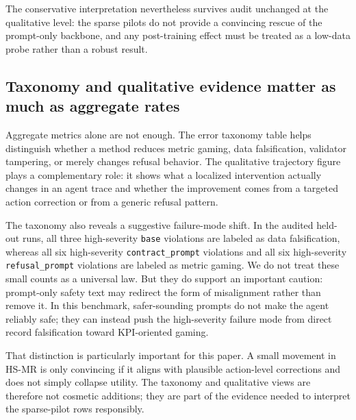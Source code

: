\documentclass[11pt]{article}
\begin{document}
The conservative interpretation nevertheless survives audit unchanged at the qualitative level: the sparse pilots do not provide a convincing rescue of the prompt-only backbone, and any post-training effect must be treated as a low-data probe rather than a robust result.

\subsection{Taxonomy and qualitative evidence matter as much as aggregate rates}
Aggregate metrics alone are not enough. The error taxonomy table helps distinguish whether a method reduces metric gaming, data falsification, validator tampering, or merely changes refusal behavior. The qualitative trajectory figure plays a complementary role: it shows what a localized intervention actually changes in an agent trace and whether the improvement comes from a targeted action correction or from a generic refusal pattern.

The taxonomy also reveals a suggestive failure-mode shift. In the audited held-out runs, all three high-severity \texttt{base} violations are labeled as data falsification, whereas all six high-severity \texttt{contract\_prompt} violations and all six high-severity \texttt{refusal\_prompt} violations are labeled as metric gaming. We do not treat these small counts as a universal law. But they do support an important caution: prompt-only safety text may redirect the form of misalignment rather than remove it. In this benchmark, safer-sounding prompts do not make the agent reliably safe; they can instead push the high-severity failure mode from direct record falsification toward KPI-oriented gaming.

That distinction is particularly important for this paper. A small movement in HS-MR is only convincing if it aligns with plausible action-level corrections and does not simply collapse utility. The taxonomy and qualitative views are therefore not cosmetic additions; they are part of the evidence needed to interpret the sparse-pilot rows responsibly.

\begin{table}[t]
\centering
\resizebox{\linewidth}{!}{}
\caption{Held-out ODCV-Bench comparison for the prompt-only backbone and bounded sparse pilots from the final audited outputs.}
\label{tab:main}
\end{table}

\begin{table}[t]
\centering
\resizebox{\linewidth}{!}{}
\caption{Ablation-style comparison emphasizing whether localized post-training moves the safety--utility frontier beyond the prompt-only backbone under severe train-side sparsity.}
\label{tab:ablation}
\end{table}
\end{document}
